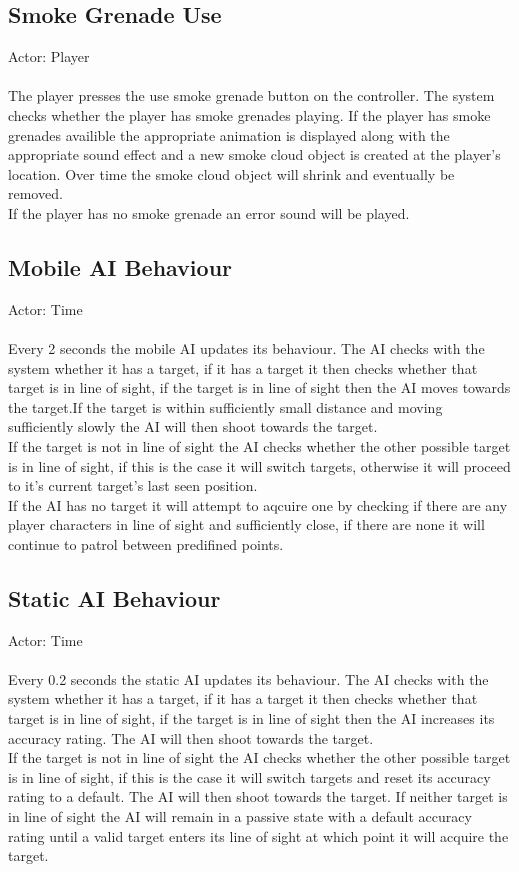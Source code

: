 \documentclass[a4paper,10pt]{article}
\begin{document}
\subsection{Smoke Grenade Use}
Actor: Player\\\\
The player presses the use smoke grenade button on the controller. The system checks whether the player has smoke grenades playing. If the player has smoke grenades availible the appropriate animation is displayed along with the appropriate sound effect and a new smoke cloud object is created at the player's location. Over time the smoke cloud object will shrink and eventually be removed.\\
If the player has no smoke grenade an error sound will be played.
\subsection{Mobile AI Behaviour}
Actor: Time\\\\
Every 2 seconds the mobile AI updates its behaviour. The AI checks with the system whether it has a target, if it has a target it then checks whether that target is in line of sight, if the target is in line of sight then the AI moves towards the target.If the target is within sufficiently small distance and moving sufficiently slowly the AI will then shoot towards the target.\\
If the target is not in line of sight the AI checks whether the other possible target is in line of sight, if this is the case it will switch targets, otherwise it will proceed to it's current target's last seen position.\\
If the AI has no target it will attempt to aqcuire one by checking if there are any player characters in line of sight and sufficiently close, if there are none it will continue to patrol between predifined points.
\subsection{Static AI Behaviour}
Actor: Time\\\\
Every 0.2 seconds the static AI updates its behaviour. The AI checks with the system whether it has a target, if it has a target it then checks whether that target is in line of sight, if the target is in line of sight then the AI increases its accuracy rating. The AI will then shoot towards the target.\\
If the target is not in line of sight the AI checks whether the other possible target is in line of sight, if this is the case it will switch targets and reset its accuracy rating to a default. The AI will then shoot towards the target. If neither target is in line of sight the AI will remain in a passive state with a default accuracy rating until a valid target enters its line of sight at which point it will acquire the target.\\
\end{document}

